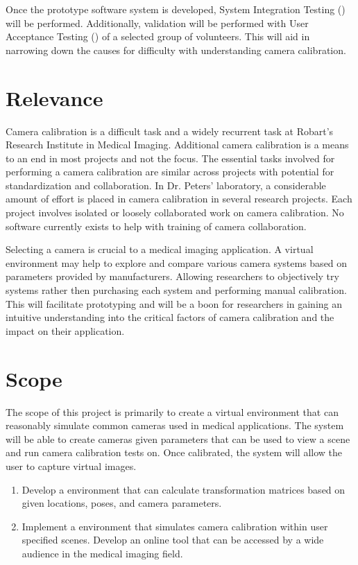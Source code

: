 \documentclass[11pt]{report}
\begin{document}

Once the prototype software system is developed, System Integration Testing () will be performed. Additionally, validation will be performed with User Acceptance Testing () of a selected group of volunteers. This will aid in narrowing down the causes for difficulty with understanding camera calibration. 

\section{Relevance}

Camera calibration is a difficult task and a widely recurrent task at Robart's Research Institute in Medical Imaging. Additional camera calibration is a means to an end in most projects and not the focus. The essential tasks involved for performing a camera calibration are similar across projects with potential for standardization and collaboration. In Dr. Peters' laboratory, a considerable amount of effort is placed in camera calibration in several research projects. Each project involves isolated or loosely collaborated work on camera calibration. No software currently exists to help with training of camera collaboration. 

Selecting a camera is crucial to a medical imaging application. A virtual environment may help to explore and compare various camera systems based on parameters provided by manufacturers. Allowing researchers to objectively try systems rather then purchasing each system and performing manual calibration. This will facilitate prototyping and will be a boon for researchers in  gaining an intuitive understanding into the critical factors of camera calibration and the impact on their application. 

\section{Scope}
The scope of this project is primarily to create a virtual environment that can reasonably simulate common cameras used in medical applications. The system will be able to create cameras given parameters that can be used to view a scene and run camera calibration tests on. Once calibrated, the system will allow the user to capture virtual images. 
 
\begin{enumerate}
\item Develop a  environment that can calculate transformation matrices based on given locations, poses, and camera parameters.  
\item Implement a  environment that simulates camera calibration within user specified scenes. Develop an online tool that can be accessed by a wide audience in the medical imaging field.
\end{enumerate}
\end{document}
